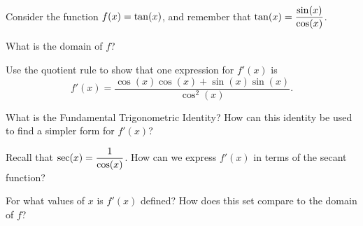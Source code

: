 \begin{activity} \label{A:2.5.Act4}
Consider the function $\displaystyle f(x) = \tan(x)$, and remember that $\displaystyle \tan(x) = \frac{\sin(x)}{\cos(x)}$.
\ba
	\item What is the domain of $f$?
	\item Use the quotient rule to show that one expression for $f'(x)$ is
	$$f'(x) = \frac{\cos(x)\cos(x) + \sin(x)\sin(x)}{\cos^2(x)}.$$
	\item What is the Fundamental Trigonometric Identity?  How can this identity be used to find a simpler form for $f'(x)$?
	\item Recall that $\displaystyle \sec(x) = \frac{1}{\cos(x)}$.  How can we express $f'(x)$ in terms of the secant function?
	\item For what values of $x$ is $f'(x)$ defined?  How does this set compare to the domain of $f$?
\ea
\end{activity} 
